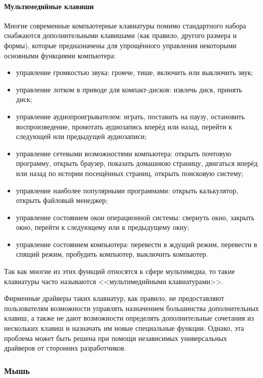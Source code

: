 \paragraph{Мультимедийные клавиши}
Многие современные компьютерные клавиатуры помимо стандартного набора снабжаются дополнительными клавишами (как правило, другого размера и формы), которые предназначены для упрощённого управления некоторыми основными функциями компьютера:
\begin{itemize}
 \item управление громкостью звука: громче, тише, включить или выключить звук;
 \item управление лотком в приводе для компакт-дисков: извлечь диск, принять диск;
 \item управление аудиопроигрывателем: играть, поставить на паузу, остановить воспроизведение, промотать аудиозапись вперёд или назад, перейти к следующей или предыдущей аудиозаписи;
 \item управление сетевыми возможностями компьютера: открыть почтовую программу, открыть браузер, показать домашнюю страницу, двигаться вперёд или назад по истории посещённых страниц, открыть поисковую систему;
 \item управление наиболее популярными программами: открыть калькулятор, открыть файловый менеджер;
 \item управление состоянием окон операционной системы: свернуть окно, закрыть окно, перейти к следующему или к предыдущему окну;
 \item управление состоянием компьютера: перевести в ждущий режим, перевести в спящий режим, пробудить компьютер, выключить компьютер.
\end{itemize}

Так как многие из этих функций относятся к сфере мультимедиа, то такие клавиатуры часто называются <<мультимедийными клавиатурами>>.

Фирменные драйверы таких клавиатур, как правило, не предоставляют пользователям возможности управлять назначением большинства дополнительных клавиш, а также не дают возможности определять дополнительные сочетания из нескольких клавиш и назначать им новые специальные функции.
Однако, эта проблема может быть решена при помощи независимых универсальных драйверов от сторонних разработчиков.

\subsubsection{Мышь}\label{base:introduction:components:peripheral:mouse}

